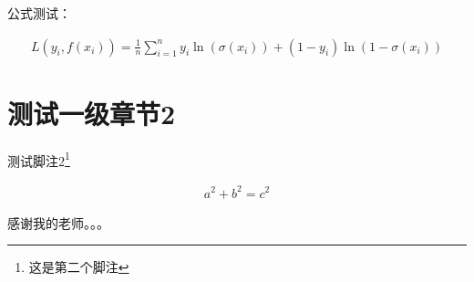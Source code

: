 \documentclass{SUIBEthesis}
\begin{document}
公式测试：

\begin{eqnarray}
L(y_i, f(x_i)) = \frac{1}{n}\sum_{i=1}^n y_i \ln (\sigma(x_i)) + (1-y_i)\ln (1-\sigma(x_i))
\end{eqnarray}



\section{测试一级章节2}
测试脚注2\footnote{这是第二个脚注}

\begin{eqnarray}
a^2 + b^2 = c^2
\end{eqnarray}

\newpage
\xiaosi



\newpage
\begin{mythanks}

感谢我的老师。。。
\end{mythanks}
\end{document}
